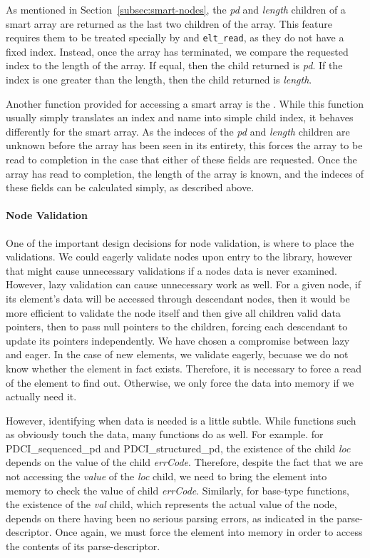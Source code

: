 \documentclass{article}
\begin{document}
As mentioned in Section~\ref{subsec:smart-nodes}, the {\em pd} and
{\em length} children of a smart array are returned as the last two
children of the array. This feature requires them to be treated
specially by \kc and \verb|elt_read|, as they do not have a fixed
index. Instead, once the array has terminated, we compare the
requested index to the length of the array. If equal, then the child
returned is {\em pd}. If the index is one greater than the length,
then the child returned is {\em length}.

Another function provided for accessing a smart array is the \kcnfun.
While this function usually simply translates an index and name into
simple child index, it behaves differently for the smart array. As the
indeces of the {\em pd} and {\em length} children are unknown before
the array has been seen in its entirety, this \kcnfun forces the array
to be read to completion in the case that either of these fields are
requested. Once the array has read to completion, the length of the
array is known, and the indeces of these fields can be calculated
simply, as described above.

\paragraph{Node Validation}
One of the important design decisions for node validation, is where to
place the validations. We could eagerly validate nodes upon entry to
the \pglx library, however that might cause unnecessary validations if
a nodes data is never examined. However, lazy validation can cause
unnecessary work as well. For a given node, if its element's data will
be accessed through descendant nodes, then it would be more efficient
to validate the node itself and then give all children valid data pointers,
then to pass null pointers to the children, forcing each descendant to
update its pointers independently.  We have chosen a compromise
between lazy and eager. In the case of new elements, we validate
eagerly, becuase we do not know whether the element in fact
exists. Therefore, it is necessary to force a read of the element to
find out. Otherwise, we only force the data into memory if we actually
need it.

However, identifying when data is needed is a little subtle. While
functions such as \tv obviously touch the data, many \kc functions do
as well. For example. for PDCI\_sequenced\_pd and
PDCI\_structured\_pd, the existence of the child {\em loc} depends on
the value of the child {\em errCode}. Therefore, despite the fact that
we are not accessing the {\em value} of the {\em loc} child, we need
to bring the element into memory to check the value of child {\em
  errCode}.  Similarly, for base-type \kc functions, the existence of
the {\em val} child, which represents the actual value of the node,
depends on there having been no serious parsing errors, as indicated
in the parse-descriptor. Once again, we must force the element into
memory in order to access the contents of its parse-descriptor.
\end{document}
